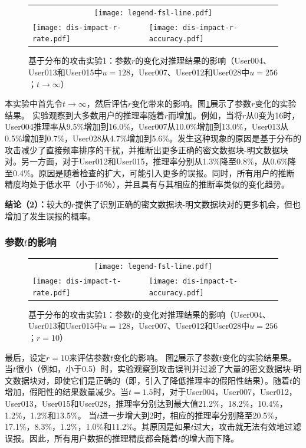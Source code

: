 \begin{figure}[!htbp]
    \centering
    \begin{tabular}{p{.48\linewidth}p{.48\linewidth}}
        \multicolumn{2}{c}{\texttt{[image: legend-fsl-line.pdf]}}  \\
        \texttt{[image: dis-impact-r-rate.pdf]} &
        \texttt{[image: dis-impact-r-accuracy.pdf]}\\
    \end{tabular}
    \caption{基于分布的攻击实验1：参数$r$的变化对推理结果的影响（User004、User013和User015中$u = 128$，User007、User012和User028中$u = 256$；$t \rightarrow \infty$）}
    \label{fig:distribution-impact-r}
\end{figure}

本实验中首先令$t\rightarrow \infty$，然后评估$r$变化带来的影响。图\ref{fig:distribution-impact-r}展示了参数$r$变化的实验结果。 实验观察到大多数用户的推理率随着$r$而增加。例如，当将$r$从0变为16时，User004推理率从9.5\%增加到16.0\%，User007从10.0\%增加到13.0\%，User013从0.5\%增加到0.7\%，User028从4.7\%增加到5.6\%。发生这种现象的原因是基于分布的攻击减少了直接频率排序的干扰，并推断出更多正确的密文数据块-明文数据块对。另一方面，对于User012和User015，推理率分别从1.3\%降至0.8\%，从0.6\%降至0.4\%。原因是随着检查的扩大，可能引入更多的误报。同时，所有用户的推断精度均处于低水平（小于45％），并且具有与其相应的推断率类似的变化趋势。


\textbf{结论（2）：}较大的$r$提供了识别正确的密文数据块-明文数据块对的更多机会，但也增加了发生误报的概率。
\subsubsection{参数$t$的影响}

\begin{figure}[!ht]
    \centering
    \begin{tabular}{p{.48\linewidth}p{.48\linewidth}}
        \multicolumn{2}{c}{\texttt{[image: legend-fsl-line.pdf]}}  \\
        \texttt{[image: dis-impact-t-rate.pdf]} &
        \texttt{[image: dis-impact-t-accuracy.pdf]}\\
    \end{tabular}
    \caption{基于分布的攻击实验1：参数$t$的变化对推理结果的影响（User004、User013和User015中$u = 128$，User007、User012和User028中$u = 256$；$r = 10$）}
    \label{fig:distribution-impact-t}
\end{figure}

最后，设定$r=10$来评估参数$t$变化的影响。 图\ref{fig:distribution-impact-t}展示了参数$t$变化的实验结果果。当$t$很小（例如，小于0.5）时，实验观察到攻击误判并过滤了大量的密文数据块-明文数据块对，即使它们是正确的（即，引入了降低推理率的假阳性结果）。随着$t$的增加，假阳性的结果数量减少。当$t= 1.5$时，对于User004，User007，User012，User013，User015和User028，推理率分别达到最大值21.2\%，18.2\%，10.4\%，1.2\%，1.2\%和13.5\%。 当$t$进一步增大到2时，相应的推理率分别降至20.5\%，17.1\%，8.3\%，1.2\%，1.0\%和11.2\%。其原因是如果$t$过大，攻击就无法有效地过滤误报。因此，所有用户数据的推理精度都会随着$t$的增大而下降。

